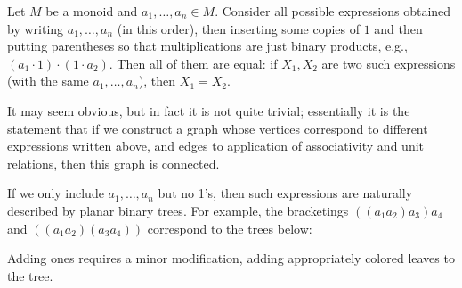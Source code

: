 \begin{theorem}\label{t:coherence-monoids}
  Let $M$ be a monoid and $a_1, \dots, a_n\in M$. Consider all possible
  expressions obtained by writing $a_1, \dots, a_n$ (in this order), then
  inserting some copies of $1$ and then putting parentheses so that
  multiplications are just binary products, e.g., $(a_1 \cdot 1) \cdot (1 \cdot
  a_2) $. Then all of them are equal: if $X_1, X_2$ are two such expressions
  (with the same $a_1, \dots, a_n$), then $X_1=X_2$.
\end{theorem}
It may seem obvious, but in fact it is not quite trivial; essentially it is the
statement that if we construct a graph whose vertices correspond to
different expressions written above, and edges to application of associativity
and unit relations, then this graph is connected.

If we only include $a_1, \dots, a_n$ but no 1's, then such expressions are
naturally described by planar binary trees. For example, the bracketings $((a_1
a_2)a_3) a_4$ and $((a_1 a_2)(a_3 a_4))$ correspond to the trees below:

\begin{center}
  \qquad
\end{center}
Adding ones requires a minor modification, adding appropriately
colored leaves to the tree.

